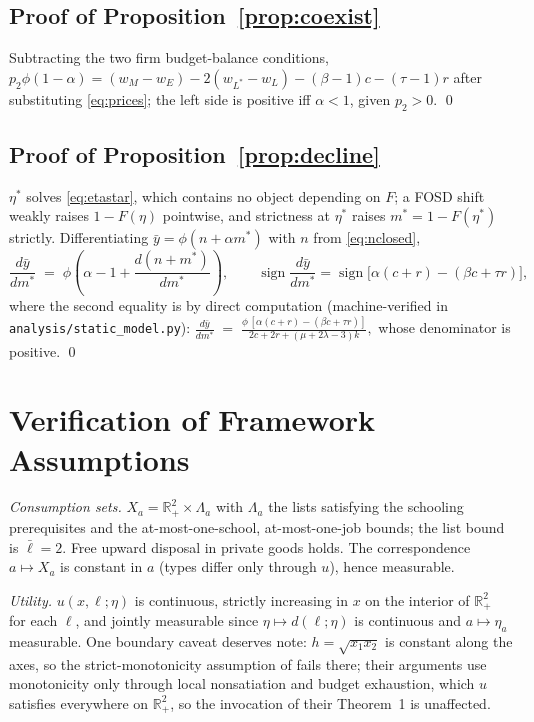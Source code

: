 \documentclass[12pt,letterpaper]{article}
\theoremstyle{definition}
\newcommand{\Lists}{\Lambda}
\newcommand{\R}{\mathbb{R}}
\begin{document}
\subsection{Proof of Proposition~\ref{prop:coexist}} Subtracting the two firm budget-balance conditions, $p_2\phi(1-\alpha) = (w_M - w_E) - 2(w_{L^\ast}-w_L) - (\beta-1)c - (\tau-1)r$ after substituting \eqref{eq:prices}; the left side is positive iff $\alpha<1$, given $p_2>0$.
\qed

\subsection{Proof of Proposition~\ref{prop:decline}} $\eta^\ast$ solves \eqref{eq:etastar}, which contains no object depending on $F$; a FOSD shift weakly raises $1-F(\eta)$ pointwise, and strictness at $\eta^\ast$ raises $m^\ast=1-F(\eta^\ast)$ strictly.
Differentiating $\bar{y} = \phi(n+\alpha m^\ast)$ with $n$ from \eqref{eq:nclosed}, \[ \frac{d\bar{y}}{dm^\ast} \;=\; \phi\left(\alpha - 1 + \frac{d(n+m^\ast)}{dm^\ast}\right),
\qquad
\operatorname{sign}\frac{d\bar{y}}{dm^\ast} = \operatorname{sign}\big[\alpha(c+r) - (\beta c + \tau r)\big], \] where the second equality is by direct computation (machine-verified in \texttt{analysis/static\_model.py}): $\frac{d\bar{y}}{dm^\ast} \;=\; \frac{\phi\,[\alpha(c+r)-(\beta c+\tau r)]}{2c+2r+(\mu+2\lambda-3)k},$ whose denominator is positive.
\qed

\section{Verification of Framework Assumptions}\label{app:assumptions}

\emph{Consumption sets.}
$X_a = \R^2_+\times\Lists_a$ with $\Lists_a$ the lists satisfying the schooling prerequisites and the at-most-one-school, at-most-one-job bounds; the list bound is $\bar\ell=2$.
Free upward disposal in private goods holds.
The correspondence $a\mapsto X_a$ is constant in $a$ (types differ only through $u$), hence measurable.

\emph{Utility.}
$u(x,\ell;\eta)$ is continuous, strictly increasing in $x$ on the interior of $\R^2_+$ for each $\ell$, and jointly measurable since $\eta\mapsto d(\ell;\eta)$ is continuous and $a\mapsto\eta_a$ measurable.
One boundary caveat deserves note: $h=\sqrt{x_1x_2}$ is constant along the axes, so the strict-monotonicity assumption of \citet{ellickson2006organization} fails there; their arguments use monotonicity only through local nonsatiation and budget exhaustion, which $u$ satisfies everywhere on $\R^2_+$, so the invocation of their Theorem~1 is unaffected.
\end{document}
